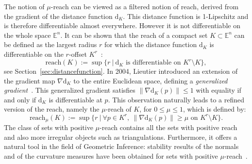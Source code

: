 \documentclass[11pt,reqno,a4paper]{article}%
\theoremstyle{definition}
\theoremstyle{remark}
\renewcommand{\leq}{\leqslant}
\renewcommand{\geq}{\geqslant}
\renewcommand{\d}{\mathrm{d}}
\newcommand{\E}{\mathbb{E}}
\newcommand{\reach}{\mathrm{reach}} %
\renewcommand{\d}{\mathrm{d}}
\begin{document}
The notion of $\mu$-reach can be viewed as a filtered notion of reach, derived from the gradient of the distance function $\d_K$.  This distance function is 1-Lipschitz and is therefore differentiable almost everywhere. However it is not differentiable on the whole space $\E^n$. It can be shown that the reach of a compact set $K\subset\E^n$ can be defined as the largest radius $r$ for which the distance function $\d_K$ is differentiable on the $r$-offset $K^r$~:
\[\reach(K) := \sup \{r ~ \vert ~  \d_K\mbox{ is differentiable on }K^r\setminus K \},\]
see Section~\ref{sec:distancefunction}.
In 2004, Lieutier introduced an extension of the gradient map $\nabla \d_K$ to the entire Euclidean space, defining a \textit{generalized gradient}~\cite{LIEUTIER20041029}. 
This generalized gradient satisfies $\|\nabla\d_K(p)\|\leq 1$ with equality if and only if $\d_K$ is differentiable at $p$. This observation naturally leads to a refined version of the reach, namely the $\mu$-reach of $K$, for  $0\leq \mu\leq 1$, which is defined by:
\[
\reach_\mu(K) := \sup \{r ~ \vert ~ \forall p\in K^r, ~ \| \nabla \d_K(p)\| \geq \mu \text{ on } K^r\setminus K \}.
\]
The class of sets with positive $\mu$-reach contains all the sets with positive reach and also more irregular objects such as triangulations. Furthermore, it offers a natural tool in the field of Geometric Inference: stability results of the normals and of the curvature measures have been obtained for sets with positive $\mu$-reach~\cite{chazal2009normal,chazal2009stability}. 
\end{document}

